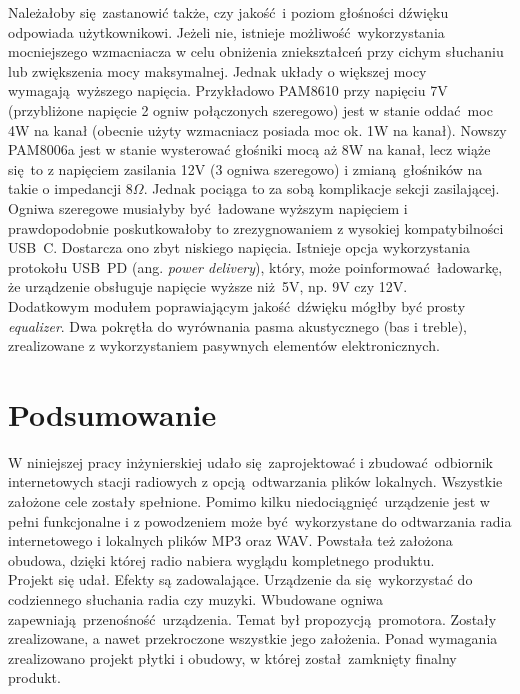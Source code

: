 \documentclass[polish]{aghengthesis}
\begin{document}
			Należałoby się zastanowić także, czy jakość i poziom głośności dźwięku odpowiada użytkownikowi. Jeżeli nie, istnieje możliwość wykorzystania mocniejszego wzmacniacza w celu obniżenia zniekształceń przy cichym słuchaniu lub zwiększenia mocy maksymalnej. Jednak układy o większej mocy wymagają wyższego napięcia.
			Przykładowo PAM8610\textsuperscript{\cite{ch5_pam8610}} przy napięciu 7V (przybliżone napięcie 2 ogniw połączonych szeregowo) jest w stanie oddać moc 4W na kanał (obecnie użyty wzmacniacz posiada moc ok. 1W na kanał). Nowszy PAM8006a\textsuperscript{\cite{ch5_pam8006a}} jest w stanie wysterować głośniki mocą aż 8W na kanał, lecz wiąże się to z napięciem zasilania 12V (3 ogniwa szeregowo) i zmianą głośników na takie o impedancji $8 \Omega$.
			Jednak pociąga to za sobą komplikacje sekcji zasilającej. Ogniwa szeregowe musiałyby być ładowane wyższym napięciem i prawdopodobnie poskutkowałoby to zrezygnowaniem z wysokiej kompatybilności USB~C. Dostarcza ono zbyt niskiego napięcia. Istnieje opcja wykorzystania protokołu USB~PD (ang. \textit{power delivery}), który, może poinformować ładowarkę, że urządzenie obsługuje napięcie wyższe niż 5V, np. 9V czy 12V.
			$ $\\
			
			Dodatkowym modułem poprawiającym jakość dźwięku mógłby być prosty \textit{equalizer}. Dwa pokrętła do wyrównania pasma akustycznego (bas i treble), zrealizowane z wykorzystaniem pasywnych elementów elektronicznych.
			
	\section{Podsumowanie}
	
		W niniejszej pracy inżynierskiej udało się zaprojektować i zbudować odbiornik internetowych stacji radiowych z opcją odtwarzania plików lokalnych.
		Wszystkie założone cele zostały spełnione. Pomimo kilku niedociągnięć urządzenie jest w pełni funkcjonalne i z powodzeniem może być wykorzystane do odtwarzania radia internetowego i lokalnych plików MP3 oraz WAV. Powstała też założona obudowa, dzięki której radio nabiera wyglądu kompletnego produktu.
		$ $\\
		
		Projekt się udał. Efekty są zadowalające. Urządzenie da się wykorzystać do codziennego słuchania radia czy muzyki. Wbudowane ogniwa zapewniają przenośność urządzenia.
		Temat był propozycją promotora.
		Zostały zrealizowane, a nawet przekroczone wszystkie jego założenia. Ponad wymagania zrealizowano projekt płytki i obudowy, w której został zamknięty finalny produkt.
		$ $\\
		
\end{document}
